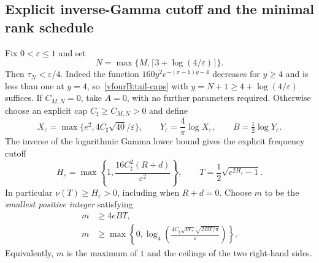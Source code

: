 \documentclass[11pt,a4paper]{article}
\numberwithin{equation}{section}
\theoremstyle{definition}\newtheorem{definition}[theorem]{Definition}
\theoremstyle{remark}\newtheorem{remark}[theorem]{Remark}
\begin{document}
\subsection{Explicit inverse-Gamma cutoff and the minimal rank schedule}
\label{vfourB:schedule}

Fix $0<\varepsilon\le1$ and set
\begin{equation}\label{vfourB:integer-cutoff}
 N=\max\{M,\lceil3+\log(4/\varepsilon)\rceil\}.
\end{equation}
Then $\tau_N<\varepsilon/4$. Indeed the function
$160y^2e^{-(\pi-1)y-4}$ decreases for $y\ge4$ and is less than one at
$y=4$, so~\eqref{vfourB:tail-caps} with
$y=N+1\ge4+\log(4/\varepsilon)$ suffices.
If $C_{M,N}=0$, take $A=0$, with no further parameters required.
Otherwise choose an explicit cap $C_\sharp\ge C_{M,N}>0$ and define
\begin{equation}\label{vfourB:spatial-cutoff}
 X_\varepsilon=\max\{e^2,4C_\sharp\sqrt{40}/\varepsilon\},\qquad
 Y_\varepsilon=\frac4\pi\log X_\varepsilon,\qquad
 B=\tfrac12\log Y_\varepsilon.
\end{equation}
The inverse of the logarithmic Gamma lower bound gives the explicit
frequency cutoff
\begin{equation}\label{vfourB:inverse-gamma}
 H_\varepsilon=
 \max\left\{1,\frac{16C_\sharp^2(R+d)}{\varepsilon^2}\right\},\qquad
 T=\frac12\sqrt{e^{2H_\varepsilon}-1}.
\end{equation}
In particular $\nu(T)\ge H_\varepsilon>0$, including when $R+d=0$.
Choose $m$ to be the \emph{smallest positive integer} satisfying
\begin{equation}\label{vfourB:minimal-m}
 \begin{split}
 m&\ge4eBT,\\
 m&\ge\max\left\{0,
   \log_4\!\left(
       \frac{4C_\sharp\sqrt{W_*}\sqrt{2BT/\pi}}{\varepsilon}
           \right)\right\}.
 \end{split}
\end{equation}
Equivalently, $m$ is the maximum of $1$ and the ceilings of the two
right-hand sides.
\end{document}
